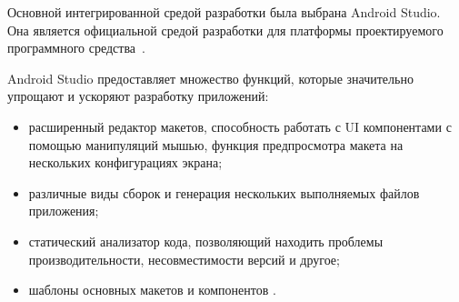 Основной интегрированной средой разработки была выбрана Android Studio. Она является официальной средой разработки для платформы проектируемого программного средства~\cite{android_studio}.

Android Studio предоставляет множество функций, которые значительно упрощают и ускоряют разработку приложений:
\begin{itemize}
    \item расширенный редактор макетов, способность работать с UI компонентами с помощью манипуляций мышью, функция предпросмотра макета на нескольких конфигурациях экрана;
    \item различные виды сборок и генерация нескольких выполняемых файлов приложения;
    \item статический анализатор кода, позволяющий находить проблемы производительности, несовместимости версий и другое;
    \item шаблоны основных макетов и компонентов \andro.
\end{itemize}